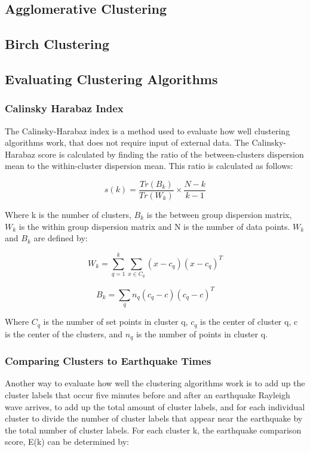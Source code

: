 \documentclass[colorlinks=true,pdfstartview=FitV,linkcolor=blue,
            citecolor=red,urlcolor=magenta]{ligodoc}
\begin{document}
\subsection{Agglomerative Clustering}

\subsection{Birch Clustering}

\subsection{Evaluating Clustering Algorithms}

\subsubsection{Calinsky Harabaz Index}

\indent

\par The Calinsky-Harabaz index is a method used to evaluate how well clustering algorithms work, that does not require input of external data. The Calinsky-Harabaz score is calculated by finding the ratio of the between-clusters dispersion mean to the within-cluster dispersion mean. This ratio is calculated as follows:

\[s(k) = \frac{Tr(B_k)}{Tr(W_k)}\times\frac{N-k}{k-1}\]

\par Where k is the number of clusters, \(B_k\) is the between group dispersion matrix, \(W_k\) is the within group dispersion matrix and N is the number of data points. \(W_k\) and  \(B_k\) are defined by:

\[W_k = \sum_{q=1}^{k} \sum_{x \in C_q} (x-c_q)(x-c_q)^T\]

\[B_k = \sum_{q} n_q (c_q-c)(c_q-c)^T\]

\par Where \(C_q\) is the number of set points in cluster q, \(c_q\) is the center of cluster q, c is the center of the clusters, and \(n_q\) is the number of points in cluster q. \cite{Citation2} 

\subsubsection{Comparing Clusters to Earthquake Times}

\indent 

\par Another way to evaluate how well the clustering algorithms work is to add up the cluster labels that occur five  minutes before and after an earthquake Rayleigh wave arrives, to add up the total amount of cluster labels, and for each individual cluster to divide the number of cluster labels that appear near the earthquake by the total number of cluster labels. For each cluster k, the earthquake comparison score, E(k) can be determined by:
\end{document}
